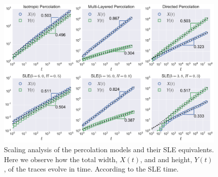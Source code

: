 \begin{figure}
\begin{center}
    \includegraphics[width=\textwidth]{chapters/ch6-asle/figs/timescaling}
\end{center}
\caption{Scaling analysis of the percolation models and their SLE equivalents.
    Here we observe how the total width, $X(t)$, and and height, $Y(t)$, of the
    traces evolve in time. According to the SLE time.}
\label{fig:timescaling}
\end{figure}





